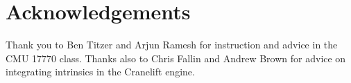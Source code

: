 \section*{Acknowledgements}

Thank you to Ben Titzer and Arjun Ramesh for instruction and advice in the CMU
17770 class.
%
Thanks also to Chris Fallin and Andrew Brown for advice on
integrating intrinsics in the Cranelift engine.
